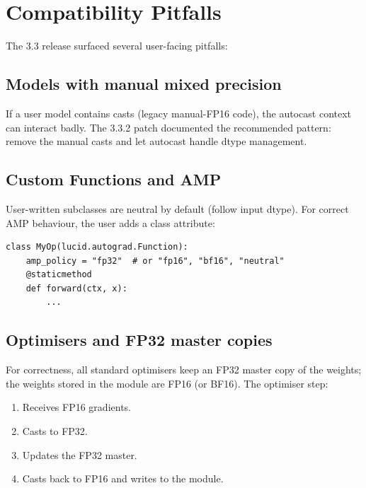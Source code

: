 \section{Compatibility Pitfalls}
\label{sec:amp_integration:compatibility}

The 3.3 release surfaced several user-facing pitfalls:

\subsection{Models with manual mixed precision}
\label{ssec:amp_integration:manual_mixed}

If a user model contains  casts (legacy
manual-FP16 code), the autocast context can interact badly.
The 3.3.2 patch documented the recommended pattern: remove the
manual casts and let autocast handle dtype management.

\subsection{Custom Functions and AMP}
\label{ssec:amp_integration:custom_fn_amp}

User-written  subclasses are
neutral by default (follow input dtype). For correct AMP
behaviour, the user adds a class attribute:

\begin{lstlisting}[style=lucid,language=LucidPython]
class MyOp(lucid.autograd.Function):
    amp_policy = "fp32"  # or "fp16", "bf16", "neutral"
    @staticmethod
    def forward(ctx, x):
        ...
\end{lstlisting}

\subsection{Optimisers and FP32 master copies}
\label{ssec:amp_integration:fp32_master}

For correctness, all standard optimisers keep an FP32 master
copy of the weights; the weights stored in the module are FP16
(or BF16). The optimiser step:
\begin{enumerate}
  \item Receives FP16 gradients.
  \item Casts to FP32.
  \item Updates the FP32 master.
  \item Casts back to FP16 and writes to the module.
\end{enumerate}

